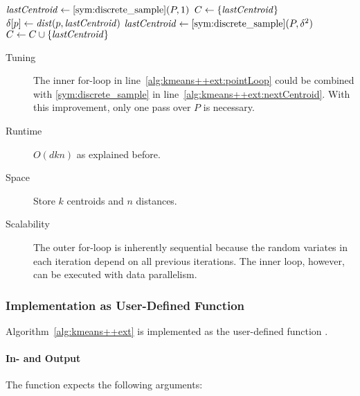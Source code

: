 \begin{algorithm} \label{alg:kmeans++ext}
\begin{algorithmic}[1]
	\State $\mathit{lastCentroid} \leftarrow \ref{sym:discrete_sample}(P, 1)$ \label{alg:kmeans++ext:firstCentroid} 
	\State $C \leftarrow \{ \mathit{lastCentroid} \}$
	 \label{alg:kmeans++ext:for}
		 \label{alg:kmeans++ext:pointLoop}
				\State $\delta[p] \leftarrow \mathit{dist}(p, \mathit{lastCentroid})$
			\EndIf
		\EndFor
		\State $\mathit{lastCentroid} \leftarrow \ref{sym:discrete_sample}(P, \delta^2)$  \label{alg:kmeans++ext:nextCentroid}
		\State $C \leftarrow C \cup \{ \mathit{lastCentroid} \}$
	\EndFor
\end{algorithmic}
\end{algorithm}

\begin{description}
	\item[Tuning] \label{kmeans++ext:tuning} The inner for-loop in line~\ref{alg:kmeans++ext:pointLoop} could be combined with \ref{sym:discrete_sample} in line~\ref{alg:kmeans++ext:nextCentroid}. With this improvement, only one pass over $P$ is necessary.
	\item[Runtime] $O(dkn)$ as explained before.
	\item[Space] Store $k$ centroids and $n$ distances.
	\item[Scalability] The outer for-loop is inherently sequential because the random variates in each iteration depend on all previous iterations. The inner loop, however, can be executed with data parallelism.
\end{description}

\subsubsection{Implementation as User-Defined Function}

Algorithm~\ref{alg:kmeans++ext} is implemented as the user-defined function .

\paragraph{In- and Output} The function expects the following arguments:

